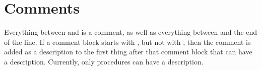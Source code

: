 \section{Comments}
Everything between \code{/*} and \code{*/} is a comment, as well as everything between \code{//} and the end of the line.  
If a comment block starts with \code{/**}, but not with \code{/***}, then the comment is added as a description to the first thing after that comment block that can have a description.  
Currently, only procedures can have a description.
